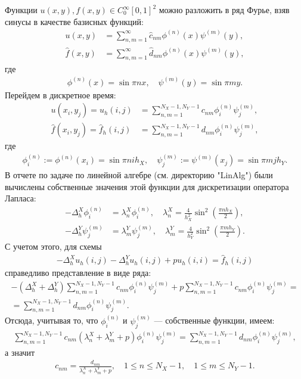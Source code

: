 \documentclass[14pt,a4paper]{extarticle}
\newcommand{\1}{\mathbbm{1}}
\begin{document}
Функции $u(x, y), f(x, y) \in C^{\infty}_0[0, 1]^2$ можно разложить в ряд Фурье,
взяв синусы в качестве базисных функций:
\begin{align*}
    u(x, y) &= \sum_{n, m = 1}^{\infty} \hat c_{nm} \phi ^{(n)}(x) \psi ^{(m)}(y), \\
    \hat f(x, y) &= \sum_{n, m = 1}^{\infty} \hat d_{nm} \phi ^{(n)}(x) \psi ^{(m)}(y),
\end{align*}
где
\begin{align*}
    \phi ^{(n)}(x) = \sin {\pi n x}, \quad \psi ^{(m)}(y) = \sin {\pi m y}.
\end{align*}
Перейдем в дискретное время:
\begin{align*}
    u(x_i, y_j) = u_h(i, j) &= \sum_{n, m = 1}^{N_X-1, N_Y-1} c_{nm} \phi ^{(n)}_i \psi ^{(m)}_j, \\
    \hat f(x_i, y_j) = \hat f_h(i, j) &= \sum_{n, m = 1}^{N_X-1, N_Y-1} d_{nm} \phi ^{(n)}_i \psi ^{(m)}_j,
\end{align*}
где
\begin{align*}
    \phi _{i}^{(n)} := \phi ^{(n)}(x_i) = \sin {\pi n i h_X}, \quad 
    \psi _{j}^{(m)} := \psi ^{(m)}(x_j) = \sin {\pi m j h_Y}.
\end{align*}
В отчете по задаче по линейной алгебре (см. директорию "LinAlg") были вычислены собственные значения этой функции для дискретизации оператора Лапласа:
\begin{align*}
    -\Delta _h^X \phi _{i}^{(n)} &= \lambda^X_n \phi _{i}^{(n)}, \quad 
    \lambda^X_n = \frac{4}{h_X^2} \sin ^2\left(\frac{\pi n h_X}{2}\right), \\
    -\Delta _h^Y \psi _{j}^{(m)} &= \lambda^Y_m \psi _{j}^{(m)}, \quad 
    \lambda^Y_m = \frac{4}{h_Y^2} \sin ^2\left(\frac{\pi m h_Y}{2}\right).
\end{align*}
С учетом этого, для схемы 
\begin{align*}
    -\Delta _h^X u_h(i, j) -\Delta _h^Y u_h(i, j) + p u_h(i, i)= \hat f_h(i, j)
\end{align*}
справедливо представление в виде ряда:
\begin{align*}
    -\left(\Delta _h^X + \Delta _h^Y\right) \sum_{n, m = 1}^{N_X-1, N_Y-1} c_{nm} \phi ^{(n)}_i \psi ^{(m)}_j  
    + p \sum_{n, m = 1}^{N_X-1, N_Y-1} c_{nm} \phi ^{(n)}_i \psi ^{(m)}_j =\\
    =   \sum_{n, m = 1}^{N_X-1, N_Y-1} d_{nm} \phi ^{(n)}_i \psi ^{(m)}_j.
\end{align*}
Отсюда, учитывая то, что $\phi ^{(n)}_i$ и $\psi ^{(m)}_j$ --- собственные функции, имеем:
\begin{align*}
    \sum_{n, m = 1}^{N_X-1, N_Y-1} c_{nm} (\lambda^X_n +  \lambda^Y_m + p) \phi ^{(n)}_i \psi ^{(m)}_j  
    = \sum_{n, m = 1}^{N_X-1, N_Y-1} d_{nm} \phi ^{(n)}_i \psi ^{(m)}_j,
\end{align*}
а значит
\begin{align*}
    c_{nm} = \frac{d_{nm}}{\lambda^X_n +  \lambda^Y_m + p}, \quad 1 \leq n \leq N_X-1, \quad 1 \leq m \leq N_Y-1.
\end{align*}
\end{document}
